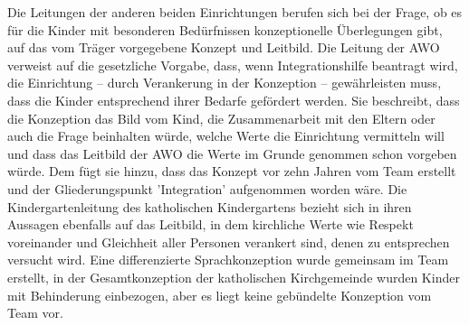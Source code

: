 Die Leitungen der anderen beiden Einrichtungen berufen sich bei der Frage, ob es für die Kinder mit besonderen Bedürfnissen konzeptionelle Überlegungen gibt, auf das vom Träger vorgegebene Konzept und Leitbild. 
Die Leitung der AWO verweist auf die gesetzliche Vorgabe, dass, wenn Integrationshilfe beantragt wird, die Einrichtung -- durch Verankerung in der Konzeption -- gewährleisten muss, dass die Kinder entsprechend ihrer Bedarfe gefördert werden. Sie beschreibt, dass die Konzeption das Bild vom Kind, die Zusammenarbeit mit den Eltern oder auch die Frage beinhalten würde, welche Werte die Einrichtung vermitteln will und dass das Leitbild der AWO die Werte im Grunde genommen schon vorgeben würde. Dem fügt sie hinzu, dass das Konzept vor zehn Jahren vom Team erstellt und der Gliederungspunkt 'Integration' aufgenommen worden wäre.   
Die Kindergartenleitung des katholischen Kindergartens bezieht sich in ihren Aussagen ebenfalls auf das Leitbild, in dem kirchliche Werte wie Respekt voreinander und Gleichheit aller Personen verankert sind, denen zu entsprechen versucht wird. Eine differenzierte Sprachkonzeption wurde gemeinsam im Team erstellt, in der Gesamtkonzeption der katholischen Kirchgemeinde wurden Kinder mit Behinderung einbezogen, aber es liegt keine gebündelte Konzeption vom Team vor. 

